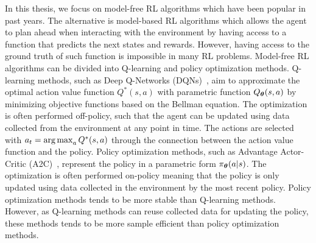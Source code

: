 In this thesis, we focus on model-free RL algorithms which have been popular in past years. The alternative is model-based RL algorithms which allows the agent to plan ahead when interacting with the environment by having access to a function that predicts the next states and rewards. However, having access to the ground truth of such function is impossible in many RL problems. Model-free RL algorithms can be divided into Q-learning and policy optimization methods. Q-learning methods, such as Deep Q-Networks (DQNs)~\cite{mnih2013playing, mnih2015human}, aim to approximate the optimal action value function $Q^{*}(s, a)$ with parametric function $Q_{{\bm{\theta}}}(s, a)$ by minimizing objective functions based on the Bellman equation. The optimization is often performed off-policy, such that the agent can be updated using data collected from the environment at any point in time. The actions are selected with $a_t = \operatorname*{arg\,max}_{a} Q^{*}(s, a)$ through the connection between the action value function and the policy.  
Policy optimization methods, such as Advantage Actor-Critic (A2C)~\cite{mnih2016asynchronous},  represent the policy in a parametric form $\pi_{{\bm{\theta}}}(a | s)$. The optimization is often performed on-policy meaning that the policy is only updated using data collected in the environment by the most recent policy. Policy optimization methods tends to be more stable than Q-learning methods. However, as Q-learning methods can reuse collected data for updating the policy, these methods tends to be more sample efficient than policy optimization methods.



